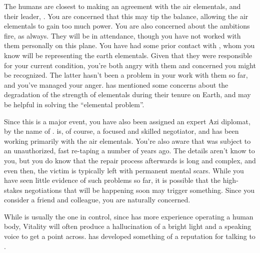\documentclass[char]{elementals}
\begin{document}
The humans are closest to making an agreement with the air elementals, and their leader, \cAirKing{}.  You are concerned that this may tip the balance, allowing the air elementals to gain too much power.  You are also concerned about the ambitions fire, as always.  They will be in attendance, though you have not worked with them personally on this plane.  You have had some prior contact with \cLoyal{}, whom you know will be representing the earth elementals.  Given that they were responsible for your current condition, you're both angry with them and concerned you might be recognized.  The latter hasn't been a problem in your work with them so far, and you've managed your anger.  \cLoyal{} has mentioned some concerns about the degradation of the strength of elementals during their tenure on Earth, and may be helpful in solving the ``elemental problem''.

Since this is a major event, you have also been assigned an expert Azi diplomat, by the name of \cDiplomat{}.  \cDiplomat{\They} is, of course, a focused and skilled negotiator, and has been working primarily with the air elementals.  You're also aware that \cDiplomat{\they} was subject to an unauthorized, fast re-taping a number of years ago.  The details aren't know to you, but you do know that the repair process afterwards is long and complex, and even then, the victim is typically left with permanent mental scars.  While you have seen little evidence of such problems so far, it is possible that the high-stakes negotiations that will be happening soon may trigger something.  Since you consider \cDiplomat{} a friend and colleague, you are naturally concerned.

While \cAvatar{} is usually the one in control, since \cAvatar{\they} has more experience operating a human body, Vitality will often produce a hallucination of a bright light and a speaking voice to get a point across.  \cAvatar{} has developed something of a reputation for talking to .


\end{document}
